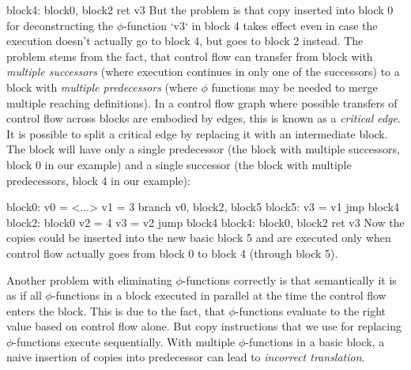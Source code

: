 block4: block0, block2
    ret v3
\endtt
%
But the problem is that copy inserted into block 0 for deconstructing the
$\phi$-function `v3` in block 4 takes effect even in case the execution doesn't
actually go to block 4, but goes to block 2 instead. The problem stems from the
fact, that control flow can transfer from block with {\em multiple successors} (where
execution continues in only one of the successors) to a block with {\em multiple
predecessors} (where $\phi$ functions may be needed to merge multiple reaching
definitions). In a control flow graph where possible transfers of control flow
across blocks are embodied by edges, this is known as a {\em critical edge}.
It is possible to split a critical edge by replacing it with an intermediate
block. The block will have only a single predecessor (the block with multiple
successors, block 0 in our example) and a single successor (the block with
multiple predecessors, block 4 in our example):

\begtt \optparams
block0:
    v0 = <...>
    v1 = 3
    branch v0, block2, block5
block5:
    v3 = v1
    jmp block4
block2: block0
    v2 = 4
    v3 = v2
    jump block4
block4: block0, block2
    ret v3
\endtt
%
Now the copies could be inserted into the new basic block 5 and are executed only
when control flow actually goes from block 0 to block 4 (through block 5).

Another problem with eliminating $\phi$-functions correctly is that semantically
it is as if all $\phi$-functions in a block executed in parallel at the time the
control flow enters the block. This is due to the fact, that $\phi$-functions
evaluate to the right value based on control flow alone. But copy instructions that
we use for replacing $\phi$-functions execute sequentially. With multiple
$\phi$-functions in a basic block, a naive insertion of copies into predecessor
can lead to {\em incorrect translation}.

